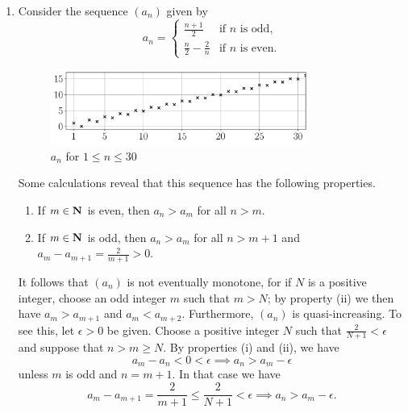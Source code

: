 \documentclass{lew98_solutions}
\begin{document}
\begin{solution}
    \begin{enumerate}
        \item Consider the sequence \( (a_n) \) given by
        \[
            a_n = \begin{cases}
                \tfrac{n+1}{2} & \text{if } n \text{ is odd}, \\
                \tfrac{n}{2} - \tfrac{2}{n} & \text{if } n \text{ is even}.
            \end{cases}
        \]
        \begin{figure}[H]
            \centering
            \includegraphics[width=0.8\textwidth]{UA_Figures/UA_ex2_6_6_fig.pdf}
            \caption{\( a_n \) for \( 1 \leq n \leq 30 \)}
            \label{fig:ex2.6.6}
        \end{figure}
        \noindent Some calculations reveal that this sequence has the following properties.
        \begin{enumerate}[label=(\roman*)]
            \item If \( m \in \mathbf{N} \) is even, then \( a_n > a_m \) for all \( n > m \).

            \item If \( m \in \mathbf{N} \) is odd, then \( a_n > a_m \) for all \( n > m + 1 \) and \( a_m - a_{m+1} = \tfrac{2}{m+1} > 0 \).
        \end{enumerate}
        It follows that \( (a_n) \) is not eventually monotone, for if \( N \) is a positive integer, choose an odd integer \( m \) such that \( m > N \); by property (ii) we then have \( a_m > a_{m+1} \) and \( a_m < a_{m+2} \). Furthermore, \( (a_n) \) is quasi-increasing. To see this, let \( \epsilon > 0 \) be given. Choose a positive integer \( N \) such that \( \tfrac{2}{N+1} < \epsilon \) and suppose that \( n > m \geq N \). By properties (i) and (ii), we have
        \[
            a_m - a_n < 0 < \epsilon \implies a_n > a_m - \epsilon
        \]
        unless \( m \) is odd and \( n = m + 1 \). In that case we have
        \[
            a_m - a_{m+1} = \frac{2}{m+1} \leq \frac{2}{N+1} < \epsilon \implies a_n > a_m - \epsilon.
        \]


\end{enumerate}
\end{solution}
\end{document}
